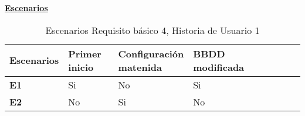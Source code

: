 \documentclass[../ei103948-project-documentation.tex]{subfiles}
\begin{document}
				\begin{center}
					\textbf{\underline{Escenarios}}
					\begin{table}[H]
						\centering
						\begin{tabular}{|p{0.14\linewidth}|p{0.20\linewidth}|p{0.20\linewidth}|p{0.20\linewidth}|p{0.12\linewidth}|p{0.12\linewidth}|p{0.12\linewidth}|}
							\hline
							\textbf{Escenarios} & \textbf{Primer inicio} & \textbf{Configuración matenida} & \textbf{BBDD modificada} \\ \hline
							\textbf{E1}         & Si                     & No                              & Si                       \\ \hline
							\textbf{E2}         & No                     & Si                              & No                       \\ \hline
							\end{tabular}
						\caption{Escenarios Requisito básico 4, Historia de Usuario 1}
					\end{table}

					\descripcionBasicaY


\end{center}
\end{document}
